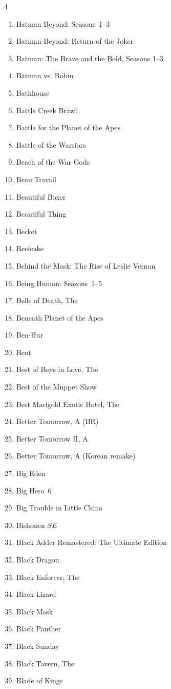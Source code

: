 \documentclass{article}
\newcommand\SE{\(SE\)}
\begin{document}
\begin{multicols}{4}
\begin{enumerate}
\item Batman Beyond: Seasons~1--3
\item Batman Beyond: Return of the Joker
\item Batman: The Brave and the Bold, Seasons 1--3
\item Batman vs. Robin
\item Bathhouse
\item Battle Creek Brawl
\item Battle for the Planet of the Apes
\item Battle of the Warriors
\item Beach of the War Gods
\item Beau Travail
\item Beautiful Boxer
\item Beautiful Thing
\item Becket
\item Beefcake
\item Behind the Mask: The Rise of Leslie Vernon
\item Being Human: Seasons~1--5
\item Bells of Death, The
\item Beneath Planet of the Apes
\item Ben-Hur
\item Bent
\item Best of Boys in Love, The
\item Best of the Muppet Show
\item Best Marigold Exotic Hotel, The
\item Better Tomorrow, A (BR)
\item Better Tomorrow II, A
\item Better Tomorrow, A (Korean remake)
\item Big Eden
\item Big Hero~6
\item Big Trouble in Little China
\item Bishonen \SE
\item Black Adder Remastered: The Ultimate Edition
\item Black Dragon
\item Black Enforcer, The
\item Black Lizard
\item Black Mask
\item Black Panther
\item Black Sunday
\item Black Tavern, The
\item Blade of Kings

\end{enumerate}
\end{multicols}
\end{document}
